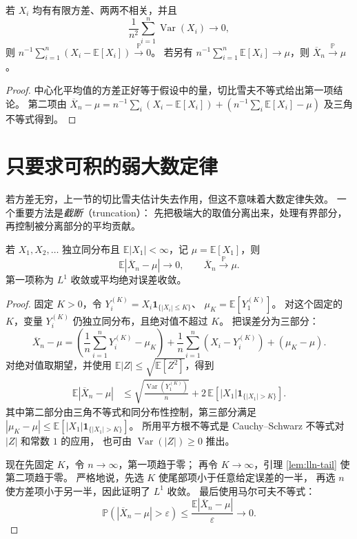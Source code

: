 \documentclass[UTF8,12pt,a4paper,fontset=fandol]{ctexart}
\begin{document}
\begin{proposition}[一个更一般的方差判据]
\label{prop:lln-variance-criterion}
若 $X_i$ 均有有限方差、两两不相关，并且
\[
  \frac1{n^2}\sum_{i=1}^n\operatorname{Var}(X_i)\longrightarrow0,
\]
则
$n^{-1}\sum_{i=1}^n(X_i-\mathbb E[X_i])\xrightarrow{\mathbb P}0$。
若另有 $n^{-1}\sum_{i=1}^n\mathbb E[X_i]\to\mu$，则 $\overline X_n\xrightarrow{\mathbb P}\mu$。
\end{proposition}

\begin{proof}
中心化平均值的方差正好等于假设中的量，切比雪夫不等式给出第一项结论。
第二项由
$\overline X_n-\mu=n^{-1}\sum_i(X_i-\mathbb E[X_i])
+(n^{-1}\sum_i\mathbb E[X_i]-\mu)$
及三角不等式得到。
\end{proof}

\section{只要求可积的弱大数定律}
\label{sec:lln-weak-integrable}

若方差无穷，上一节的切比雪夫估计失去作用，但这不意味着大数定律失效。
一个重要方法是\emph{截断}（truncation）：
先把极端大的取值分离出来，处理有界部分，再控制被分离部分的平均贡献。

\begin{theorem}[可积独立同分布变量的平均收敛]
\label{thm:lln-wlln-integrable}
若 $X_1,X_2,\ldots$ 独立同分布且 $\mathbb E|X_1|<\infty$，记
$\mu=\mathbb E[X_1]$，则
\begin{equation}
  \mathbb E|\overline X_n-\mu|\longrightarrow0,
  \qquad
  \overline X_n\xrightarrow{\mathbb P}\mu.
  \label{eq:lln-l1-convergence}
\end{equation}
第一项称为 $L^1$ 收敛或平均绝对误差收敛。
\end{theorem}

\begin{proof}
固定 $K>0$，令
$Y_i^{(K)}=X_i\mathbf1_{\{|X_i|\leq K\}}$、
$\mu_K=\mathbb E[Y_1^{(K)}]$。
对这个固定的 $K$，变量 $Y_i^{(K)}$ 仍独立同分布，且绝对值不超过 $K$。
把误差分为三部分：
\[
  \overline X_n-\mu
  =\left(\frac1n\sum_{i=1}^nY_i^{(K)}-\mu_K\right)
   +\frac1n\sum_{i=1}^n(X_i-Y_i^{(K)})
   +(\mu_K-\mu).
\]
对绝对值取期望，并使用
$\mathbb E|Z|\leq\sqrt{\mathbb E[Z^2]}$，得到
\begin{align}
  \mathbb E|\overline X_n-\mu|
  &\leq
  \sqrt{\frac{\operatorname{Var}(Y_1^{(K)})}{n}}
  +2\,\mathbb E[|X_1|\mathbf1_{\{|X_1|>K\}}].
  \label{eq:lln-truncation-l1-bound}
\end{align}
其中第二部分由三角不等式和同分布性控制，第三部分满足
$|\mu_K-\mu|\leq\mathbb E[|X_1|\mathbf1_{\{|X_1|>K\}}]$。
所用平方根不等式是 Cauchy--Schwarz 不等式对 $|Z|$ 和常数 $1$ 的应用，
也可由 $\operatorname{Var}(|Z|)\geq0$ 推出。

现在先固定 $K$，令 $n\to\infty$，第一项趋于零；
再令 $K\to\infty$，引理 \ref{lem:lln-tail} 使第二项趋于零。
严格地说，先选 $K$ 使尾部项小于任意给定误差的一半，
再选 $n$ 使方差项小于另一半，因此证明了 $L^1$ 收敛。
最后使用马尔可夫不等式：
\[
  \mathbb P(|\overline X_n-\mu|>\varepsilon)
  \leq\frac{\mathbb E|\overline X_n-\mu|}{\varepsilon}
  \longrightarrow0.
\]
\end{proof}
\end{document}
